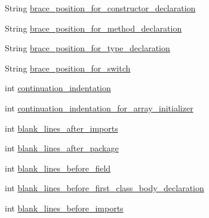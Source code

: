 \begin{DoxyCompactItemize}
\item 
String \hyperlink{classorg_1_1eclipse_1_1jdt_1_1ui_1_1tests_1_1refactoring_1_1infra_1_1TestFormatterOptions_acd69c9556217c39a2cccc9195697bbf1}{brace\_\-position\_\-for\_\-constructor\_\-declaration}
\item 
String \hyperlink{classorg_1_1eclipse_1_1jdt_1_1ui_1_1tests_1_1refactoring_1_1infra_1_1TestFormatterOptions_aa9c77c7ed487680f59f3efcf8eee4a83}{brace\_\-position\_\-for\_\-method\_\-declaration}
\item 
String \hyperlink{classorg_1_1eclipse_1_1jdt_1_1ui_1_1tests_1_1refactoring_1_1infra_1_1TestFormatterOptions_a060a4005529fd60ebe673b62078c4b01}{brace\_\-position\_\-for\_\-type\_\-declaration}
\item 
String \hyperlink{classorg_1_1eclipse_1_1jdt_1_1ui_1_1tests_1_1refactoring_1_1infra_1_1TestFormatterOptions_aaf21d5c02a9271d1755f7410b81b7181}{brace\_\-position\_\-for\_\-switch}
\item 
int \hyperlink{classorg_1_1eclipse_1_1jdt_1_1ui_1_1tests_1_1refactoring_1_1infra_1_1TestFormatterOptions_abeaceeffa454c0bde289a9a4de2d82c0}{continuation\_\-indentation}
\item 
int \hyperlink{classorg_1_1eclipse_1_1jdt_1_1ui_1_1tests_1_1refactoring_1_1infra_1_1TestFormatterOptions_a5e4b3c2991156a0b281123f385973c60}{continuation\_\-indentation\_\-for\_\-array\_\-initializer}
\item 
int \hyperlink{classorg_1_1eclipse_1_1jdt_1_1ui_1_1tests_1_1refactoring_1_1infra_1_1TestFormatterOptions_a9a9da9b2399817edb3d2304d88ffef10}{blank\_\-lines\_\-after\_\-imports}
\item 
int \hyperlink{classorg_1_1eclipse_1_1jdt_1_1ui_1_1tests_1_1refactoring_1_1infra_1_1TestFormatterOptions_a2ac20bed1cc249baf874970c99973a78}{blank\_\-lines\_\-after\_\-package}
\item 
int \hyperlink{classorg_1_1eclipse_1_1jdt_1_1ui_1_1tests_1_1refactoring_1_1infra_1_1TestFormatterOptions_a4b9ff708592f027e0ca2cc78569440f8}{blank\_\-lines\_\-before\_\-field}
\item 
int \hyperlink{classorg_1_1eclipse_1_1jdt_1_1ui_1_1tests_1_1refactoring_1_1infra_1_1TestFormatterOptions_a5bc95a077694f478bb9bf812f97c8422}{blank\_\-lines\_\-before\_\-first\_\-class\_\-body\_\-declaration}
\item 
int \hyperlink{classorg_1_1eclipse_1_1jdt_1_1ui_1_1tests_1_1refactoring_1_1infra_1_1TestFormatterOptions_a1fc495ff17a3f18a7ee39d0b60fb4dac}{blank\_\-lines\_\-before\_\-imports}
\item 

\end{DoxyCompactItemize}
